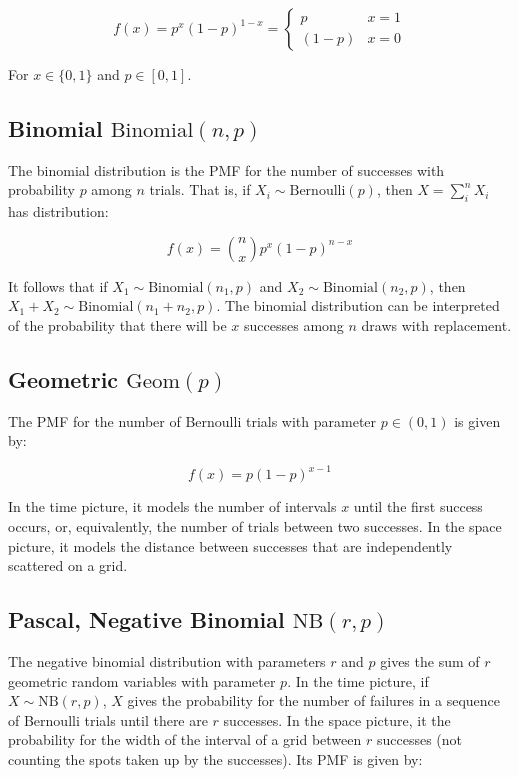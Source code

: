 \begin{equation}
f(x) = p^x (1-p)^{1-x} =  \left\{\begin{array}{cl} 
p& x = 1\\
(1-p)& x=0
\end{array} \right.
\end{equation}

For $x\in\{0,1\}$ and $p\in[0,1]$.


\subsection{Binomial $\mathrm{Binomial}(n,p)$}
The binomial distribution is the PMF for the number of successes with probability $p$ among $n$ trials. That is, if $X_i \sim \mathrm{Bernoulli}(p)$, then $X = \sum_i^n X_i$ has distribution:

\begin{equation}
f(x) = {n \choose x} p^x (1-p)^{n-x}
\end{equation}

It follows that if $X_1 \sim \mathrm{Binomial}(n_1,p)$ and $X_2 \sim \mathrm{Binomial}(n_2,p)$, then $X_1 + X_2 \sim \mathrm{Binomial}(n_1+n_2,p)$. The binomial distribution can be interpreted of the probability that there will be $x$ successes among $n$ draws with replacement.


\subsection{Geometric $\mathrm{Geom}(p)$}
The PMF for the number of Bernoulli trials with parameter $p\in(0,1)$ is given by: 

\begin{equation}
f(x) = p(1-p)^{x-1}
\end{equation}

In the time picture, it models the number of intervals $x$ until the first success occurs, or, equivalently, the number of trials between two successes. In the space picture, it models the distance between successes that are independently scattered on a grid.



\subsection{Pascal, Negative Binomial $\mathrm{NB}(r,p)$}
The negative binomial distribution with parameters $r$ and $p$ gives the sum of $r$ geometric random variables with parameter $p$. In the time picture, if $X \sim \mathrm{NB}(r,p)$, $X$ gives the probability for the number of failures in a sequence of Bernoulli trials until there are $r$ successes. In the space picture, it the probability for the width of the interval of a grid between $r$ successes (not counting the spots taken up by the successes). Its PMF is given by:

